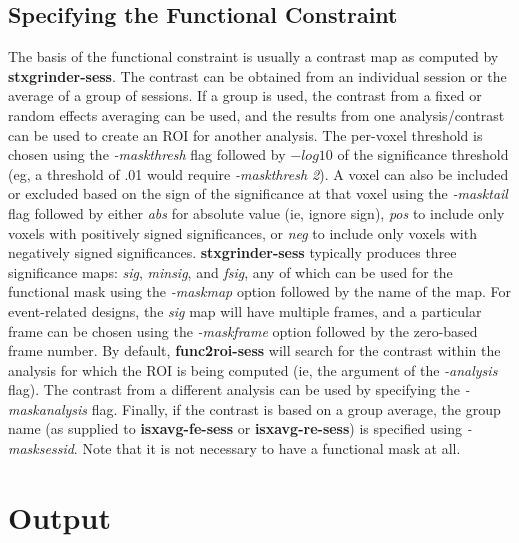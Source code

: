 \documentclass[10pt]{article}
\begin{document}
\subsection{Specifying the Functional Constraint}

The basis of the functional constraint is usually a contrast map as
computed by {\bf stxgrinder-sess}.  The contrast can be obtained from
an individual session or the average of a group of sessions. If a
group is used, the contrast from a fixed or random effects averaging
can be used, and the results from one analysis/contrast can be used to
create an ROI for another analysis.  The per-voxel threshold is chosen
using the {\em -maskthresh} flag followed by $-log10$ of the
significance threshold (eg, a threshold of .01 would require {\em
-maskthresh 2}).  A voxel can also be included or excluded based on
the sign of the significance at that voxel using the {\em -masktail}
flag followed by either {\em abs} for absolute value (ie, ignore
sign), {\em pos} to include only voxels with positively signed
significances, or {\em neg} to include only voxels with negatively
signed significances.  {\bf stxgrinder-sess} typically produces three
significance maps: {\em sig}, {\em minsig}, and {\em fsig}, any of
which can be used for the functional mask using the {\em -maskmap}
option followed by the name of the map.  For event-related designs,
the {\em sig} map will have multiple frames, and a particular frame
can be chosen using the {\em -maskframe} option followed by the
zero-based frame number. By default, {\bf func2roi-sess} will search
for the contrast within the analysis for which the ROI is being
computed (ie, the argument of the {\em -analysis} flag). The contrast
from a different analysis can be used by specifying the {\em
-maskanalysis} flag.  Finally, if the contrast is based on a group
average, the group name (as supplied to {\bf isxavg-fe-sess} or {\bf
isxavg-re-sess}) is specified using {\em -masksessid}. Note that it is
not necessary to have a functional mask at all.

\section{Output}
\end{document}
